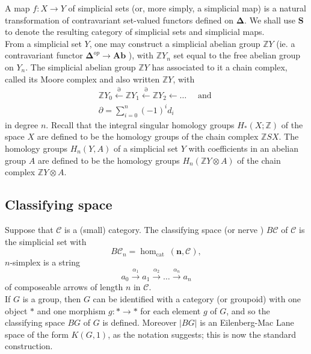 \documentclass{book}
\begin{document}
A map $f: X \rightarrow Y$ of simplicial sets (or, more simply, a simplicial map) is a natural transformation of contravariant set-valued functors defined on $\boldsymbol{\Delta}$. We shall use $\mathbf{S}$ to denote the resulting category of simplicial sets and simplicial maps.\\

From a simplicial set $Y$, one may construct a simplicial abelian group $\mathbb{Z} Y$ (ie. a contravariant functor $\boldsymbol{\Delta}^{o p} \rightarrow \mathbf{A b}$ ), with $\mathbb{Z} Y_n$ set equal to the free abelian group on $Y_n$. The simplicial abelian group $\mathbb{Z} Y$ has associated to it a chain complex, called its Moore complex and also written $\mathbb{Z} Y$, with
$$
\begin{gathered}
\mathbb{Z} Y_0 \stackrel{\partial}{\leftarrow} \mathbb{Z} Y_1 \stackrel{\partial}{\leftarrow} \mathbb{Z} Y_2 \leftarrow \ldots \quad \text { and } \\
\partial=\sum_{i=0}^n(-1)^i d_i
\end{gathered}
$$
in degree $n$. Recall that the integral singular homology groups $H_*(X ; \mathbb{Z})$ of the space $X$ are defined to be the homology groups of the chain complex $\mathbb{Z} S X$. The homology groups $H_n(Y, A)$ of a simplicial set $Y$ with coefficients in an abelian group $A$ are defined to be the homology groups $H_n(\mathbb{Z} Y \otimes A)$ of the chain complex $\mathbb{Z} Y \otimes A$.


\subsection*{Classifying space}

Suppose that $\mathcal{C}$ is a (small) category. The classifying space (or nerve ) $B \mathcal{C}$ of $\mathcal{C}$ is the simplicial set with
$$
B \mathcal{C}_n=\operatorname{hom}_{\text {cat }}(\mathbf{n}, \mathcal{C}),
$$
$n$-simplex is a string
$$
a_0 \xrightarrow{\alpha_1} a_1 \xrightarrow{\alpha_2} \ldots \xrightarrow{\alpha_n} a_n
$$
of composeable arrows of length $n$ in $\mathcal{C}$.\\

If $G$ is a group, then $G$ can be identified with a category (or groupoid) with one object $*$ and one morphism $g: * \rightarrow *$ for each element $g$ of $G$, and so the classifying space $B G$ of $G$ is defined. Moreover $|B G|$ is an Eilenberg-Mac Lane space of the form $K(G, 1)$, as the notation suggests; this is now the standard construction.
\end{document}
